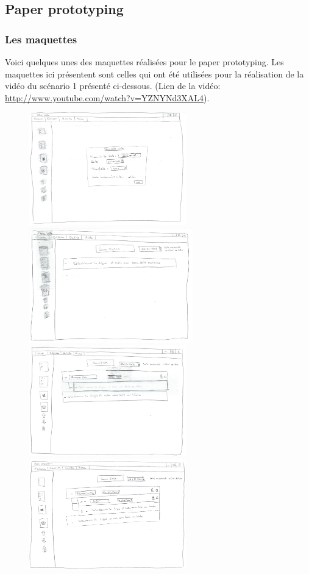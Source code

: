 \documentclass[a4paper,10pt]{article}
\begin{document}
\subsection{Paper prototyping}

\subsubsection{Les maquettes}
Voici quelques unes des maquettes réalisées pour le paper prototyping. Les maquettes
ici présentent sont celles qui ont été utilisées pour la réalisation de la vidéo du scénario 1 présenté ci-dessous.
(Lien de la vidéo: \url{http://www.youtube.com/watch?v=YZNYNd3XAL4}).
\begin{figure}[H]
    \center
    \includegraphics[width=6.8cm]{Images/maquette1.jpeg}
    \includegraphics[width=7.1cm]{Images/maquette2.jpeg}
    \includegraphics[width=6.8cm]{Images/maquette3.jpeg}
    \includegraphics[width=6.8cm]{Images/maquette4.jpeg}

\end{figure}
\end{document}

